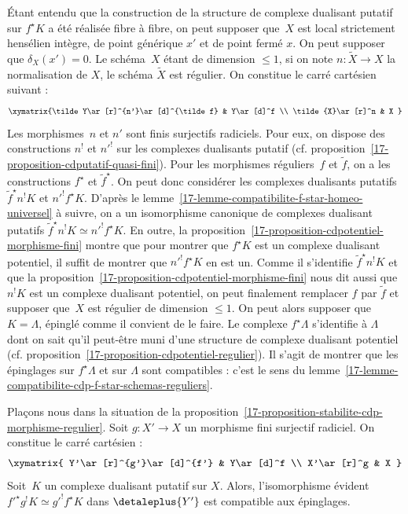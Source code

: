\documentclass[10pt]{../fichiers-configuration-latex/smfart}
\begin{document}
Étant entendu que la construction de la structure de complexe dualisant
putatif sur $f^\star K$ a été réalisée fibre à fibre, on peut 
supposer que $X$ est local strictement hensélien intègre, de point
générique $x'$ et de point fermé $x$. On peut supposer que
$\delta_X(x')=0$.
Le schéma $X$ étant de dimension
$\leq 1$, si on note $n\colon \tilde X\to X$ la normalisation de $X$, le schéma
$\tilde X$ est régulier. On constitue le carré cartésien suivant :
\[
\xymatrix{\tilde Y\ar[r]^{n'}\ar[d]^{\tilde f} & Y\ar[d]^f \\
\tilde{X}\ar[r]^n & X
}
\]
Les morphismes $n$ et $n'$ sont finis surjectifs radiciels. Pour eux, on
dispose des constructions $n^!$ et ${n'}^!$ sur les complexes dualisants
putatif (cf. proposition~\ref{17-proposition-cdputatif-quasi-fini}).
Pour les morphismes
réguliers $f$ et $\tilde f$, on a les
constructions $f^\star$ et ${\tilde f}^\star$. On peut donc considérer les
complexes dualisants putatifs ${\tilde f}^\star n^!K$ et ${n'}^!f^\star K$.
D'après le lemme~\ref{17-lemme-compatibilite-f-star-homeo-universel} à suivre,
on a un isomorphisme canonique de complexes dualisant putatifs 
${\tilde f}^\star n^!K\simeq {n'}^!f^\star K$. En outre, la
proposition~\ref{17-proposition-cdpotentiel-morphisme-fini} montre que pour
montrer que $f^\star K$ est un complexe dualisant potentiel, il suffit de
montrer que ${n'}^!f^\star K$ en est un. Comme il s'identifie
${\tilde f}^\star n^!K$ et que la 
proposition~\ref{17-proposition-cdpotentiel-morphisme-fini} nous dit aussi que 
$n^!K$ est un complexe dualisant potentiel, on peut finalement remplacer
$f$ par $\tilde f$ et supposer que $X$ est
régulier de dimension $\leq 1$.
On peut alors supposer que $K=\Lambda$,
épinglé comme il convient de le faire. Le complexe $f^\star \Lambda$
s'identifie à $\Lambda$ dont on sait qu'il peut-être muni d'une structure
de complexe dualisant potentiel
(cf. proposition~\ref{17-proposition-cdpotentiel-regulier}). Il s'agit de
montrer que les épinglages sur $f^\star \Lambda$ et sur $\Lambda$ sont
compatibles : c'est le sens du
lemme~\ref{17-lemme-compatibilite-cdp-f-star-schemas-reguliers}.

\begin{lemme3}\label{17-lemme-compatibilite-f-star-homeo-universel}
Plaçons nous dans la situation de la
proposition~\ref{17-proposition-stabilite-cdp-morphisme-regulier}. Soit
$g\colon X'\to X$ un morphisme fini surjectif radiciel. On constitue le
carré cartésien :
\[
\xymatrix{
Y'\ar[r]^{g'}\ar[d]^{f'} & Y\ar[d]^f \\
X'\ar[r]^g & X
}
\]
Soit $K$ un complexe dualisant putatif sur $X$. Alors, l'isomorphisme
évident ${f'}^\star g^! K\simeq {g'}^!f^\star K$ dans $\detaleplus {Y'}$ est
compatible aux épinglages.
\end{lemme3}
\end{document}
